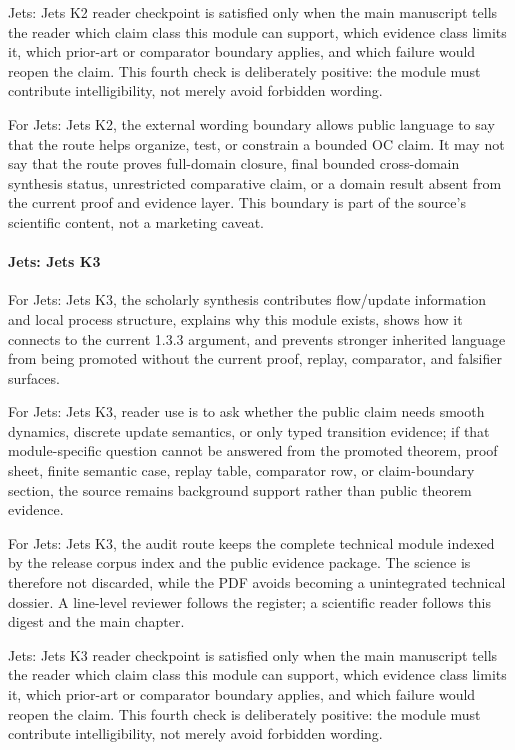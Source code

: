 Jets: Jets K2 reader checkpoint is satisfied only when the main manuscript tells the reader which claim class this module can support, which evidence class limits it, which prior-art or comparator boundary applies, and which failure would reopen the claim. This fourth check is deliberately positive: the module must contribute intelligibility, not merely avoid forbidden wording.


For Jets: Jets K2, the external wording boundary allows public language to say that the route helps organize, test, or constrain a bounded OC claim. It may not say that the route proves full-domain closure, final bounded cross-domain synthesis status, unrestricted comparative claim, or a domain result absent from the current proof and evidence layer. This boundary is part of the source's scientific content, not a marketing caveat.


\paragraph{Jets: Jets K3}

For Jets: Jets K3, the scholarly synthesis contributes flow/update information and local process structure, explains why this module exists, shows how it connects to the current 1.3.3 argument, and prevents stronger inherited language from being promoted without the current proof, replay, comparator, and falsifier surfaces.


For Jets: Jets K3, reader use is to ask whether the public claim needs smooth dynamics, discrete update semantics, or only typed transition evidence; if that module-specific question cannot be answered from the promoted theorem, proof sheet, finite semantic case, replay table, comparator row, or claim-boundary section, the source remains background support rather than public theorem evidence.


For Jets: Jets K3, the audit route keeps the complete technical module indexed by the release corpus index and the public evidence package. The science is therefore not discarded, while the PDF avoids becoming a unintegrated technical dossier. A line-level reviewer follows the register; a scientific reader follows this digest and the main chapter.


Jets: Jets K3 reader checkpoint is satisfied only when the main manuscript tells the reader which claim class this module can support, which evidence class limits it, which prior-art or comparator boundary applies, and which failure would reopen the claim. This fourth check is deliberately positive: the module must contribute intelligibility, not merely avoid forbidden wording.


